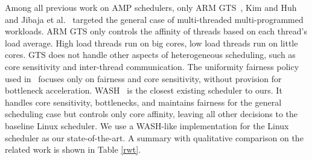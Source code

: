 Among all previous work on AMP schedulers, only ARM GTS~\cite{jeff2013big}, Kim and Huh~\cite{kim2018exploring} and Jibaja et al.~\cite{jibaja2016portable} targeted the general case of multi-threaded multi-programmed workloads. 
ARM GTS only controls the affinity of threads based on each thread's load average. High load threads run on big cores, low load threads run on little cores. GTS does not handle other aspects of heterogeneous scheduling, such as core sensitivity and inter-thread communication. The uniformity fairness policy used in~\cite{kim2018exploring} focuses only on fairness and core sensitivity, without provision for bottleneck acceleration. WASH~\cite{jibaja2016portable} is the closest existing scheduler to ours. It handles core sensitivity, bottlenecks, and maintains fairness for the general scheduling case but controls only core affinity, leaving all other decisions to the baseline Linux scheduler. We use a WASH-like implementation for the Linux scheduler  as our state-of-the-art. A summary with qualitative comparison on the related work is shown in Table \ref{rwt}.
\vspace{-1em}

